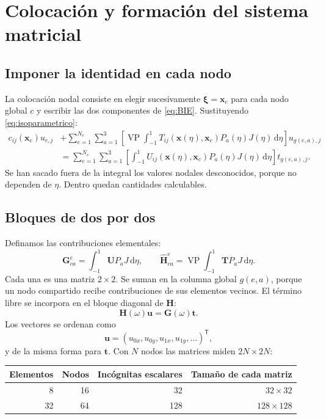 \documentclass[11pt,a4paper]{report}
\numberwithin{equation}{chapter}
\newcommand{\vect}[1]{\bm{#1}}
\newcommand{\dd}{\,\mathrm{d}}
\newcommand{\VP}{\operatorname{VP}}
\begin{document}
\chapter{Colocaci\'on y formaci\'on del sistema matricial}
\label{ch:sistema}

\section{Imponer la identidad en cada nodo}
La colocaci\'on nodal consiste en elegir sucesivamente
$\vect\xi=\vect x_c$ para cada nodo global $c$ y escribir las dos
componentes de \eqref{eq:BIE}. Sustituyendo \eqref{eq:isoparametrico}:
\begin{align}
 c_{ij}(\vect x_c)u_{c,j}
 &+\sum_{e=1}^{N_e}\sum_{a=1}^3
 \left[\VP\int_{-1}^1T_{ij}(\vect x(\eta),\vect x_c)
               P_a(\eta)J(\eta)\dd\eta\right]u_{g(e,a),j}
 \nonumber\\
 &=\sum_{e=1}^{N_e}\sum_{a=1}^3
 \left[\int_{-1}^1U_{ij}(\vect x(\eta),\vect x_c)
               P_a(\eta)J(\eta)\dd\eta\right]t_{g(e,a),j}.
 \label{eq:colocacion}
\end{align}
Se han sacado fuera de la integral los valores nodales desconocidos,
porque no dependen de $\eta$. Dentro quedan cantidades calculables.

\section{Bloques de dos por dos}
Definamos las contribuciones elementales:
\begin{equation}
 \vect G^e_{ca}=\int_{-1}^1\vect U P_aJ\dd\eta,\qquad
 \vect{\widehat H}^e_{ca}=
           \VP\int_{-1}^1\vect T P_aJ\dd\eta.
\end{equation}
Cada una es una matriz $2\times2$. Se suman en la columna global
$g(e,a)$, porque un nodo compartido recibe contribuciones de sus
elementos vecinos. El t\'ermino libre se incorpora en el bloque diagonal
de $\vect H$:
\begin{equation}
  \boxed{\vect H(\omega)\vect u=\vect G(\omega)\vect t.}
  \label{eq:HG}
\end{equation}
Los vectores se ordenan como
\begin{equation}
 \vect u=(u_{0x},u_{0y},u_{1x},u_{1y},\ldots)^{\mathsf T},
\end{equation}
y de la misma forma para $\vect t$. Con $N$ nodos las matrices miden
$2N\times2N$:
\begin{center}
\begin{tabular}{rrrr}
\toprule
Elementos & Nodos & Inc\'ognitas escalares & Tama\~no de cada matriz\\
\midrule
8 & 16 & 32 & $32\times32$\\
32 & 64 & 128 & $128\times128$\\
\bottomrule
\end{tabular}
\end{center}
\end{document}
